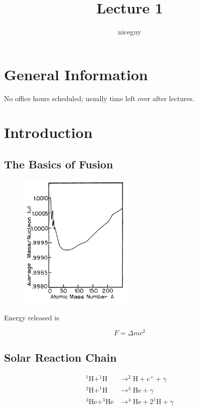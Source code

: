 \documentclass[12pt]{article}
\title{Lecture 1}
\author{niceguy}
\begin{document}
\maketitle

\section{General Information}

No office hours scheduled; usually time left over after lectures.

\section{Introduction}

\subsection{The Basics of Fusion}

\begin{figure}
    \includegraphics[width=0.5\textwidth]{1.png}
\end{figure}

Energy released is

\begin{equation}
    F = \Delta mc^2
\end{equation}

\subsection{Solar Reaction Chain}

\begin{align*}
    ^1\text{H} + ^1\text{H} &\rightarrow ^2\text{H} + e^+ + \gamma \\
    ^2\text{H} + ^1\text{H} &\rightarrow ^3\text{He} + \gamma \\
    ^3\text{He} + ^3\text{He} &\rightarrow ^4\text{He} + 2^1\text{H} + \gamma
\end{align*}
\end{document}

